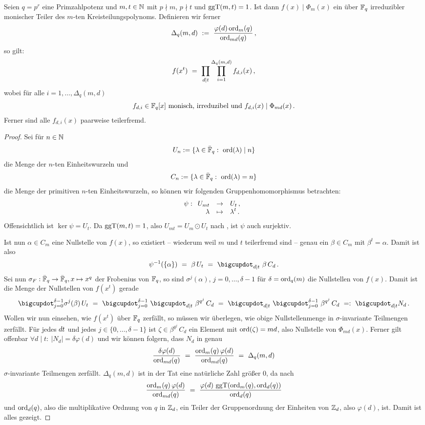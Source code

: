 \begin{satz}
  \label{satz:f_x_s_ist_teiler_von_phimd}
  Seien $q=p^r$ eine Primzahlpotenz und
  $m,t\in \mathbb{N}$ mit $p\nmid m$, $p\nmid t$ und $\operatorname{ggT}(m,t) = 1$. Ist dann 
  $f(x) \mid \Phi_m(x)$ ein über $\mathbb{F}_q$ irreduzibler monischer Teiler des
  $m$-ten Kreisteilungspolynoms. Definieren wir 
  ferner 
  \[ \Delta_q(m,d) \ :=\  \frac{\varphi(d) \operatorname{ord}_m(q)}{\operatorname{ord}_{md}(q)}\,,\]
  so gilt:
  \[ f(x^t) \ =\  \prod_{d\mid t} \prod_{i=1}^{\Delta_q(m,d)} f_{d,i}(x)\,,\]
  wobei für alle $i=1,\ldots,\Delta_q(m,d)$ 
  \[ f_{d,i}\in \mathbb{F}_q[x] 
    \text{ monisch, irreduzibel und } f_{d,i}(x) \mid \Phi_{md}(x)\,.\]
  Ferner sind alle $f_{d,i}(x)$ paarweise teilerfremd.
\end{satz}
\begin{proof}
  Sei für $n\in \mathbb{N}$
  \[ U_n := \{ \lambda \in \bar\F_q:\ \ord(\lambda)\mid n\}\]
  die Menge der $n$-ten Einheitswurzeln und
  \[ C_n := \{\lambda \in \bar {\mathbb{F}}_q:\ \operatorname{ord}(\lambda) = n\}\]
  die Menge der primitiven $n$-ten Einheitswurzeln, so können wir folgenden
  Gruppenhomomorphismus betrachten:
  \[ \psi: \funcdef{U_{mt} &\to& U_t\,,\\ \lambda&\mapsto& \lambda^t\,.}\]
  Offensichtlich ist $\ker\psi = U_t$. Da $\operatorname{ggT}(m,t) = 1$, also 
  $U_{mt} = U_m \odot U_t$ nach \thref{}, ist $\psi$ auch surjektiv.

  Ist nun $\alpha \in C_m$ eine Nullstelle von $f(x)$, so existiert -- wiederum
  weil $m$ und $t$ teilerfremd sind -- genau ein $\beta \in C_m$ mit
  $\beta^t = \alpha$. Damit ist also
  \[ \psi\inv(\{\alpha\}) \speq= \beta\, U_t \speq=
    \bigcupdot_{d\mid t}\ \beta\, C_d \,.\]
  Sei nun $\sigma_F: \bar{\mathbb{F}}_q \to \bar{\mathbb{F}}_q, x\mapsto x^q$ der Frobenius von
  $\mathbb{F}_q$, so sind $\sigma^j(\alpha)$, $j=0,\ldots,\delta-1$ für 
  $\delta=\operatorname{ord}_q(m)$ die Nullstellen von $f(x)$. Damit ist die Menge der
  Nullstellen von $f(x^t)$ gerade
  \[ \bigcupdot_{j=0}^{\delta-1} \sigma^j(\beta)\, U_t \speq=
    \bigcupdot_{j=0}^{\delta-1}\ \bigcupdot_{d\mid t}\ \beta^{q^j}\, C_d
    \speq=
    \bigcupdot_{d\mid t}\ \bigcupdot_{j=0}^{\delta-1}\ \beta^{q^j}\, C_d
    \speq{=:} \bigcupdot_{d\mid t} N_d\,. \]
  Wollen wir nun einsehen, wie $f(x^t)$ über $\mathbb{F}_q$ zerfällt, so müssen wir
  überlegen, wie obige Nullstellenmenge in $\sigma$-invariante Teilmengen
  zerfällt. Für jedes $d\mit t$ und jedes $j\in\{0,\ldots,\delta -1\}$ ist
  $\zeta \in \beta^{q^j}\,C_d$ ein Element mit $\operatorname{ord}(\zeta) = md$, also
  Nullstelle von $\Phi_{md}(x)$. Ferner gilt
  offenbar $\forall d\mid t:\ |N_d| = \delta\varphi(d)$
  und wir können folgern, dass $N_d$ in genau
  \[ \frac{\delta\varphi(d)}{\operatorname{ord}_{md}(q)} \ =\  \frac{\operatorname{ord}_m(q)\,
    \varphi(d)}{\operatorname{ord}_{md}(q)} \ =\ 
    \Delta_q(m,d)\]
  $\sigma$-invariante Teilmengen zerfällt. $\Delta_q(m,d)$ ist in der Tat eine
  natürliche Zahl größer 0, da nach \thref{}
  \[ \frac{\operatorname{ord}_m(q)\,\varphi(d)}{\operatorname{ord}_{md}(q)} \ =\ 
    \frac{\varphi(d)\, \operatorname{ggT}(\operatorname{ord}_m(q),\operatorname{ord}_d(q))}{\operatorname{ord}_d(q)}\]
  und $\operatorname{ord}_d(q)$, also die multiplikative Ordnung von $q$ in $\mathbb{Z}_d$, ein
  Teiler der Gruppenordnung der Einheiten von $\mathbb{Z}_d$, also $\varphi(d)$, ist.
  Damit ist alles gezeigt.
\end{proof}

